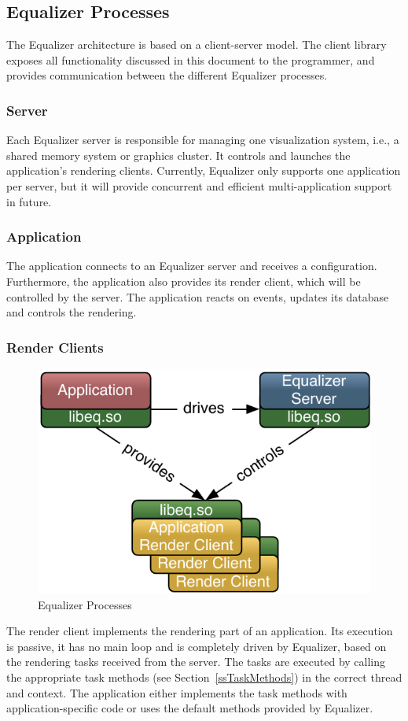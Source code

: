 \documentclass[10pt,a4]{scrartcl}
\newcommand{\sref}[1]{Section~\ref{#1}}
\begin{document}
\subsection{Equalizer Processes}

The Equalizer architecture is based on a client-server model. The client
library exposes all functionality discussed in this document to the
programmer, and provides communication between the different Equalizer
processes.

\subsubsection{Server}
Each Equalizer server is responsible for managing one visualization
system, i.e., a shared memory system or graphics cluster.  It controls
and launches the application's rendering clients.  Currently, Equalizer
only supports one application per server, but it will provide
concurrent and efficient multi-application support in future.

\subsubsection{Application}

The application connects to an Equalizer server and receives a
configuration.  Furthermore, the application also provides its render
client, which will be controlled by the server. The application reacts
on events, updates its database and controls the rendering.

\subsubsection{Render Clients}

\begin{figure}
  \includegraphics[width=.382\textwidth]{images/processes.pdf}
  {\caption{\small\label{fProcesses}Equalizer Processes}}
\end{figure}
The render client implements the rendering part of an application. Its
execution is passive, it has no main loop and is completely driven by
Equalizer, based on the rendering tasks received from the server. The
tasks are executed by calling the appropriate task methods (see
\sref{ssTaskMethods}) in the correct thread and context. The application
either implements the task methods with application-specific code or
uses the default methods provided by Equalizer.
\end{document}
